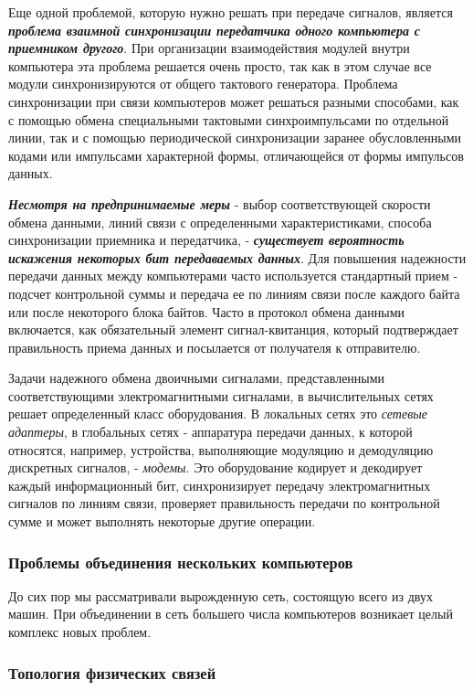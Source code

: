 Еще одной проблемой, которую нужно решать при передаче сигналов, является \textbf{\textit{проблема взаимной синхронизации передатчика одного компьютера с приемником другого}}.
При организации взаимодействия модулей внутри компьютера эта проблема решается очень просто, так как в этом случае все модули синхронизируются от общего тактового генератора.
Проблема синхронизации при связи компьютеров может решаться разными способами, как с помощью обмена специальными тактовыми синхроимпульсами по отдельной линии, так и с помощью периодической синхронизации заранее обусловленными кодами или импульсами характерной формы, отличающейся от формы импульсов данных.

\textbf{\textit{Несмотря на предпринимаемые меры}} - выбор соответствующей скорости обмена данными, линий связи с определенными характеристиками, способа синхронизации приемника и передатчика, - \textbf{\textit{существует вероятность искажения некоторых бит передаваемых данных}}.
Для повышения надежности передачи данных между компьютерами часто используется стандартный прием - подсчет контрольной суммы и передача ее по линиям связи после каждого байта или после некоторого блока байтов.
Часто в протокол обмена данными включается, как обязательный элемент сигнал-квитанция, который подтверждает правильность приема данных и посылается от получателя к отправителю.

Задачи надежного обмена двоичными сигналами, представленными соответствующими электромагнитными сигналами, в вычислительных сетях решает определенный класс оборудования.
В локальных сетях это \emph{сетевые адаптеры}, в глобальных сетях - аппаратура передачи данных, к которой относятся, например, устройства, выполняющие модуляцию и демодуляцию дискретных сигналов, - \emph{модемы}.
Это оборудование кодирует и декодирует каждый информационный бит, синхронизирует передачу электромагнитных сигналов по линиям связи, проверяет правильность передачи по контрольной сумме и может выполнять некоторые другие операции.

\subsubsection{Проблемы объединения нескольких компьютеров}

До сих пор мы рассматривали вырожденную сеть, состоящую всего из двух машин.
При объединении в сеть большего числа компьютеров возникает целый комплекс новых проблем.

\subsubsection{Топология физических связей}

